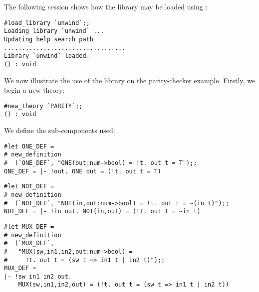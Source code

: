 The following session shows how the  library may be loaded using
:

\setcounter{sessioncount}{1}
\begin{session}\begin{verbatim}
#load_library `unwind`;;
Loading library `unwind` ...
Updating help search path
..................................
Library `unwind` loaded.
() : void
\end{verbatim}\end{session}

We now illustrate the use of the library on the parity-checker example.
Firstly, we begin a new theory:

\begin{session}\begin{verbatim}
#new_theory `PARITY`;;
() : void
\end{verbatim}\end{session}

\vfill

\noindent
We define the sub-components used:

\vfill

\begin{session}\begin{verbatim}
#let ONE_DEF =
# new_definition
#  (`ONE_DEF`, "ONE(out:num->bool) = !t. out t = T");;
ONE_DEF = |- !out. ONE out = (!t. out t = T)
\end{verbatim}\end{session}

\vfill

\begin{session}\begin{verbatim}
#let NOT_DEF =
# new_definition
#  (`NOT_DEF`, "NOT(in,out:num->bool) = !t. out t = ~(in t)");;
NOT_DEF = |- !in out. NOT(in,out) = (!t. out t = ~in t)
\end{verbatim}\end{session}

\vfill

\begin{session}\begin{verbatim}
#let MUX_DEF =
# new_definition
#  (`MUX_DEF`,
#   "MUX(sw,in1,in2,out:num->bool) =
#     !t. out t = (sw t => in1 t | in2 t)");;
MUX_DEF = 
|- !sw in1 in2 out.
    MUX(sw,in1,in2,out) = (!t. out t = (sw t => in1 t | in2 t))
\end{verbatim}\end{session}

\vfill

